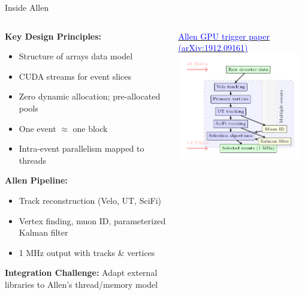 \documentclass[10pt,aspectratio=169]{beamer}
\begin{document}
\begin{frame}{Inside Allen}
  \begin{columns}[T]
    \begin{column}{0.58\textwidth}
      \small
      \textbf{Key Design Principles:}
      \begin{itemize}
        \item Structure of arrays data model
        \item CUDA streams for event slices
        \item Zero dynamic allocation; pre-allocated pools
        \item One event $\approx$ one block
        \item Intra-event parallelism mapped to threads
      \end{itemize}
      \vspace{0.3cm}
      \textbf{Allen Pipeline:}
      \begin{itemize}
        \item Track reconstruction (Velo, UT, SciFi)
        \item Vertex finding, muon ID, parameterized Kalman filter
        \item 1 MHz output with tracks \& vertices
      \end{itemize}
      \vspace{0.3cm}
      \textbf{Integration Challenge:} Adapt external libraries to Allen's thread/memory model
    \end{column}
    \begin{column}{0.42\textwidth}
      \begin{center}
        \href{https://arxiv.org/abs/1912.09161}{\textcolor{blue}{Allen GPU trigger paper (arXiv:1912.09161)}}
        \\
        \vspace{0.2cm}
        \includegraphics[width=0.95\textwidth]{figures/allen-workflow-compact.pdf}
      \end{center}
    \end{column}
  \end{columns}
\end{frame}
\end{document}
